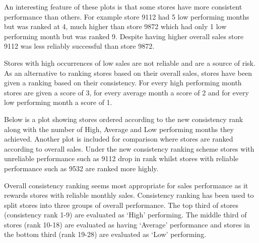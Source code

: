 \documentclass[
  11pt,
]{article}
\begin{document}
An interesting feature of these plots is that some stores have more
consistent performance than others. For example store 9112 had 5 low
performing months but was ranked at 4, much higher than store 9872 which
had only 1 low performing month but was ranked 9. Despite having higher
overall sales store 9112 was less reliably successful than store 9872.

Stores with high occurrences of low sales are not reliable and are a
source of risk. As an alternative to ranking stores based on their
overall sales, stores have been given a ranking based on their
consistency. For every high performing month stores are given a score of
3, for every average month a score of 2 and for every low performing
month a score of 1.

Below is a plot showing stores ordered according to the new consistency
rank along with the number of High, Average and Low performing months
they achieved. Another plot is included for comparison where stores are
ranked according to overall sales. Under the new consistency ranking
scheme stores with unreliable performance such as 9112 drop in rank
whilst stores with reliable performance such as 9532 are ranked more
highly.

Overall consistency ranking seems most appropriate for sales performance
as it rewards stores with reliable monthly sales. Consistency ranking
has been used to split stores into three groups of overall performance.
The top third of stores (consistency rank 1-9) are evaluated as `High'
performing. The middle third of stores (rank 10-18) are evaluated as
having `Average' performance and stores in the bottom third (rank 19-28)
are evaluated as `Low' performing.
\end{document}
